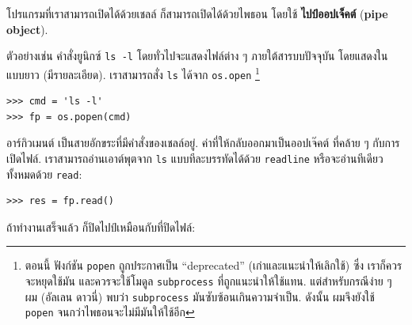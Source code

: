 
โปรแกรมที่เราสามารถเปิดได้ด้วยเชลล์ ก็สามารถเปิดได้ด้วยไพธอน โดยใช้ \textbf{ไปป์ออปเจ็คต์} (\textbf{pipe object}).



ตัวอย่างเช่น คำสั่งยูนิกซ์ \texttt{ls -l} โดยทั่วไปจะแสดงไฟล์ต่าง ๆ ภายใต้สารบบปัจจุบัน โดยแสดงในแบบยาว (มีรายละเอียด).
เราสามารถสั่ง \texttt{ls} ได้จาก \texttt{os.open}%
\footnote{ตอนนี้ ฟังก์ชัน \texttt{popen} ถูกประกาศเป็น ``deprecated'' (เก่าและแนะนำให้เลิกใช้)
ซึ่ง เราก็ควรจะหยุดใช้มัน และควรจะใช้โมดูล \texttt{subprocess} ที่ถูกแนะนำให้ใช้แทน.
แต่สำหรับกรณีง่าย ๆ ผม (อัลเลน ดาวนี่) พบว่า \texttt{subprocess} มันซับซ้อนเกินความจำเป็น.
ดังนั้น ผมจึงยังใช้ \texttt{popen} จนกว่าไพธอนจะไม่มีมันให้ใช้อีก}%


\begin{verbatim}
>>> cmd = 'ls -l'
>>> fp = os.popen(cmd)
\end{verbatim}
%
%
อาร์กิวเมนต์ เป็นสายอักขระที่มีคำสั่งของเชลล์อยู่.
ค่าที่ให้กลับออกมาเป็นออปเจ๊คต์ ที่คล้าย ๆ กับการเปิดไฟล์.
เราสามารถอ่านเอาต์พุตจาก \texttt{ls} แบบทีละบรรทัดได้ด้วย \texttt{readline}
หรือจะอ่านทีเดียวทั้งหมดด้วย \texttt{read}:


\begin{verbatim}
>>> res = fp.read()
\end{verbatim}
%
%
ถ้าทำงานเสร็จแล้ว ก็ปิดไปป์เหมือนกับที่ปิดไฟล์:


